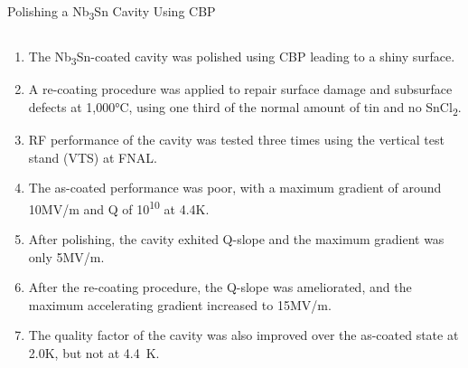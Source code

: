 \documentclass{beamer}
\begin{document}
\begin{frame}{}
\begin{columns}[t]
\begin{column}{0.32\textwidth}
\begin{block}{\label{sec:cavitycbp}Polishing a Nb\textsubscript{3}Sn Cavity Using CBP}
\begin{columns}
\begin{column}{0.45\columnwidth}
                        \end{column}
                    \end{columns}    
                    \begin{enumerate}
                        \item The Nb\textsubscript{3}Sn-coated cavity was polished using CBP leading to a shiny surface.
                        \item A re-coating procedure was applied to repair surface damage and subsurface defects at 1,000°C, using one third of the normal amount of tin and no SnCl\textsubscript{2}.
                        \item RF performance of the cavity was tested three times using the vertical test stand (VTS) at FNAL.
                        \item The as-coated performance was poor, with a maximum gradient of around 10MV/m and Q of 10\textsuperscript{10} at 4.4K.
                        \item After polishing, the cavity exhited Q-slope and the maximum gradient was only 5MV/m.
                        \item After the re-coating procedure, the Q-slope was ameliorated, and the maximum accelerating gradient increased to 15MV/m.
                        \item The quality factor of the cavity was also improved over the as-coated state at 2.0K, but not at 4.4~K.
                    \end{enumerate}
                    
                \end{block}
            \end{column}
        \end{columns}
    \end{frame}
\end{document}
